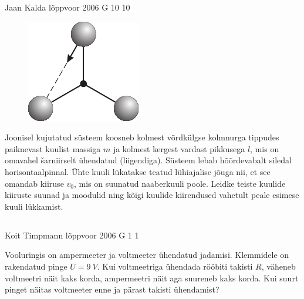 \documentclass[11pt]{article}
\begin{document}
{%
{Jaan Kalda} %
{lõppvoor} %
{2006} %
{G 10} %
{10} %
{
\ifStatement
\begin{figure}
	\begin{center}
		\vspace{-25pt}
		\includegraphics[width=\linewidth]{2006-v3g-10-yl}
	\end{center}
\end{figure}
Joonisel kujutatud süsteem koosneb kolmest võrdkülgse kolmnurga tippudes paiknevast kuulist massiga $m$ ja kolmest kergest vardast pikkusega $l$, mis on omavahel šarniirselt ühendatud (liigendiga). Süsteem lebab hõõrdevabalt siledal horisontaalpinnal. Ühte kuuli lükatakse teatud lühiajalise jõuga nii, et see omandab kiiruse $v_0$, mis on suunatud naaberkuuli poole. Leidke teiste kuulide kiiruste suunad ja moodulid ning kõigi kuulide kiirendused vahetult peale esimese kuuli lükkamist.
\fi
}
\newpage\subsection{\protect{}}

{Koit Timpmann} %
{lõppvoor} %
{2006} %
{G 1} %
{1} %
{
\ifStatement
Vooluringis on ampermeeter ja voltmeeter ühendatud jadamisi. Klemmidele on rakendatud pinge $U = \SI{9}{V}$. Kui voltmeetriga ühendada rööbiti takisti $R$, väheneb voltmeetri näit kaks korda, ampermeetri näit aga suureneb kaks korda. Kui suurt pinget näitas voltmeeter enne ja pärast takisti ühendamist?

}}
\end{document}
